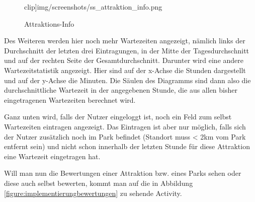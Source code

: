 \begin{figure}[H]
\begin{minipage}{0.49\textwidth}
    	clip]{img/screenshots/ss_attraktion_info.png}
    	\caption{Attraktions-Info}
		\label{figure:implementierungattraktionsinfo}
	\end{minipage}
\end{figure}

Des Weiteren werden hier noch mehr Wartezeiten angezeigt, nämlich links der Durchschnitt der letzten drei Eintragungen, in der Mitte der Tagesdurchschnitt und auf der rechten Seite der Gesamtdurchschnitt. 
Darunter wird eine andere Wartezeitstatistik angezeigt. Hier sind auf der x-Achse die Stunden dargestellt und auf der y-Achse die Minuten. Die Säulen des Diagramms sind dann also die durchschnittliche Wartezeit in der angegebenen Stunde, die aus allen bisher eingetragenen Wartezeiten berechnet wird. 

Ganz unten wird, falls der Nutzer eingeloggt ist, noch ein Feld zum selbst Wartezeiten eintragen angezeigt. Das Eintragen ist aber nur möglich, falls sich der Nutzer zusätzlich noch im Park befindet (Standort muss < 2km vom Park entfernt sein) und nicht schon innerhalb der letzten Stunde für diese Attraktion eine Wartezeit eingetragen hat. 

Will man nun die Bewertungen einer Attraktion bzw. eines Parks sehen oder diese auch selbst bewerten, kommt man auf die in Abbildung \ref{figure:implementierungbewertungen} zu sehende Activity.

